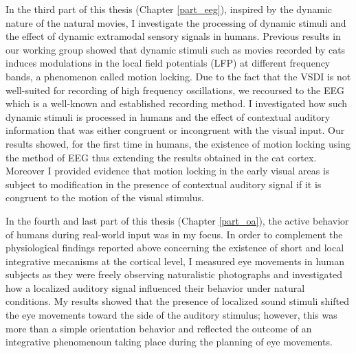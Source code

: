 In the third part of this thesis (Chapter \ref{part_eeg}), inspired by the
dynamic nature of the natural movies, I investigate the processing of
dynamic stimuli and the effect of dynamic extramodal sensory signals in
humans.  Previous results in our working group \citep{kayser2004b} showed
that dynamic stimuli such as movies recorded by cats induces modulations in
the local field potentials (LFP) 
at different frequency bands, a phenomenon called motion locking. Due to
the fact that the VSDI is not well-suited for recording of high frequency
oscillations, we recoursed to the EEG which is a well-known and established
recording method. I investigated
how such dynamic stimuli is processed in humans and the effect of
contextual auditory information that was either congruent or incongruent
with the visual input. Our results showed, for the first time in humans,
the existence of motion locking using the method of EEG thus extending the
results obtained in the cat cortex. Moreover I provided evidence that
motion locking in the early visual areas is subject to modification in the
presence of contextual auditory signal if it is congruent to the motion of
the visual stimulus. 


In the fourth and last part of this thesis (Chapter \ref{part_oa}), the
active behavior of humans during real-world input was in my focus. In order
to complement the physiological findings reported above concerning the
existence of short and local integrative mecanisms at the cortical level, I
measured eye movements in human subjects as they were freely observing
naturalistic photographs and investigated how a localized auditory signal
influenced their behavior under natural conditions. My results showed that
the presence of localized sound stimuli shifted the eye movements toward
the side of the auditory stimulus; however, this was more than a simple
orientation behavior and reflected the outcome of an integrative
phenomenoun taking place during the planning of eye movements.
